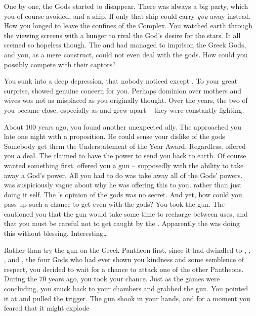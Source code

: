 \documentclass[char]{guardians}
\begin{document}
One by one, the Gods started to disappear. There was always a big party, which you of course avoided, and a ship. If only that ship could carry \emph{you} away instead. How you longed to leave the confines of the Complex. You watched earth through the viewing screens with a hunger to rival the God's desire for the stars. It all seemed so hopeless though.  The \cWarden{} and \cCaretaker{} had managed to imprison the Greek Gods, and you, as a mere construct, could not even deal with the gods. How could you possibly compete with their captors?

You sunk into a deep depression, that nobody noticed except \cHera{}. To your great surprise, \cHera{\they} showed genuine concern for you. Perhaps \cHera{\them} dominion over mothers and wives was not as misplaced as you originally thought. Over the years, the two of you became close, especially as \cHera{} and \cAthena{} grew apart -- they were constantly fighting.


About 100 years ago, you found another unexpected ally. The \cWarden{} approached you late one night with a proposition. He could sense your dislike of the gods Somebody get \cWarden{\them} them the Understatement of the Year Award. Regardless, \cWarden{\They} offered you a deal. The \cWarden{} claimed to have the power to send you back to earth. Of course  wanted something first. \cWarden{} offered you a gun -- supposedly with the ability to take away a God's power.  All you had to do was take away all of the Gods' powers. \cWarden{\They} was suspiciously vague about why he was offering this to you, rather than just doing it \cWarden{\them}self. The \cWarden{}'s opinion of the gods was no secret. And yet, how could you pass up such a chance to get even with the gods? You took the gun. The \cWarden{} cautioned you that the gun would take some time to recharge between uses, and that you must be careful not to get caught by the \cCaretaker{}. Apparently the \cWarden{} was doing this without \cCaretaker{\them} blessing. Interesting\ldots{}

Rather than try the gun on the Greek Pantheon first, since it had dwindled to \cZeus{}, \cAthena{}, \cHephaestus{}, and \cHera{}, the four Gods who had ever shown you kindness and some semblence of respect, you decided to wait for a chance to attack one of the other Pantheons.  During the \pGames{} 70 years ago, you took your chance. Just as the games were concluding, you snuck back to your chambers and grabbed the gun. You pointed it at \cOsiris{} and pulled the trigger. The gun shook in your hands, and for a moment you feared that it might explode
\end{document}
